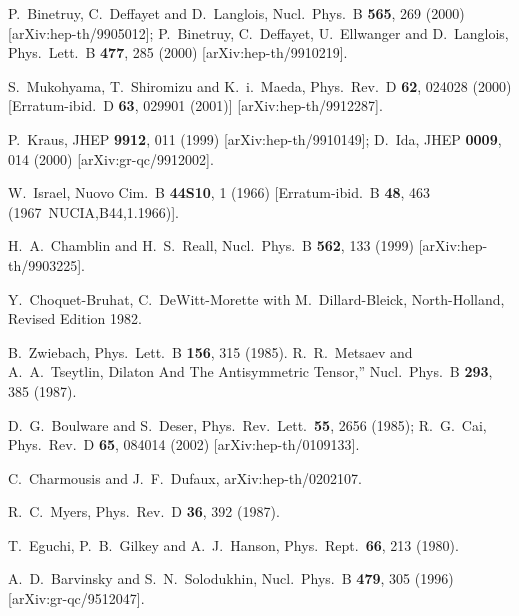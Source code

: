 \documentclass[a4paper,a4paper]{article}
\begin{document}
\begin{thebibliography}{99} 


P.~Binetruy, C.~Deffayet and D.~Langlois,
Nucl.\ Phys.\ B {\bf 565}, 269 (2000)
[arXiv:hep-th/9905012];
P.~Binetruy, C.~Deffayet, U.~Ellwanger and D.~Langlois,
Phys.\ Lett.\ B {\bf 477}, 285 (2000)
[arXiv:hep-th/9910219].


S.~Mukohyama, T.~Shiromizu and K.~i.~Maeda,
Phys.\ Rev.\ D {\bf 62}, 024028 (2000)
[Erratum-ibid.\ D {\bf 63}, 029901 (2001)]
[arXiv:hep-th/9912287].


P.~Kraus,
JHEP {\bf 9912}, 011 (1999)
[arXiv:hep-th/9910149];
D.~Ida,
JHEP {\bf 0009}, 014 (2000)
[arXiv:gr-qc/9912002].


W.~Israel,
Nuovo Cim.\ B {\bf 44S10}, 1 (1966)
[Erratum-ibid.\ B {\bf 48}, 463 (1967\ NUCIA,B44,1.1966)].

H.~A.~Chamblin and H.~S.~Reall,
Nucl.\ Phys.\ B {\bf 562}, 133 (1999)
[arXiv:hep-th/9903225].

Y.~Choquet-Bruhat, C.~DeWitt-Morette with M.~Dillard-Bleick,
North-Holland, Revised Edition 1982.


B.~Zwiebach,
Phys.\ Lett.\ B {\bf 156}, 315 (1985).
R.~R.~Metsaev and A.~A.~Tseytlin,
Dilaton And The Antisymmetric Tensor,''
Nucl.\ Phys.\ B {\bf 293}, 385 (1987).

D.~G.~Boulware and S.~Deser,
Phys.\ Rev.\ Lett.\  {\bf 55}, 2656 (1985);
R.~G.~Cai,
Phys.\ Rev.\ D {\bf 65}, 084014 (2002)
[arXiv:hep-th/0109133].


C.~Charmousis and J.~F.~Dufaux,
arXiv:hep-th/0202107.

R.~C.~Myers,
Phys.\ Rev.\ D {\bf 36}, 392 (1987).

T.~Eguchi, P.~B.~Gilkey and A.~J.~Hanson,
Phys.\ Rept.\  {\bf 66}, 213 (1980).

A.~D.~Barvinsky and S.~N.~Solodukhin,
Nucl.\ Phys.\ B {\bf 479}, 305 (1996)
[arXiv:gr-qc/9512047].



\end{thebibliography}
\end{document}
